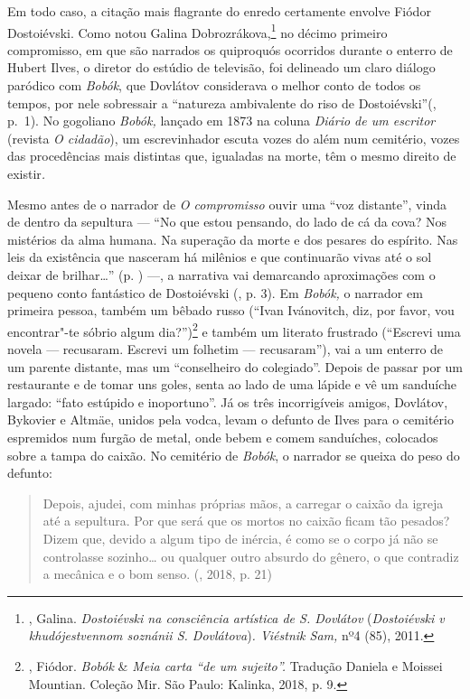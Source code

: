 Em todo caso, a citação mais flagrante do enredo certamente envolve
Fiódor Dostoiévski. Como notou Galina Dobrozrákova,\footnote{,
  Galina. \emph{Dostoiévski na consciência artística de S. Dovlátov}
  (\emph{Dostoiévski v khudójestvennom soznánii S. Dovlátova})\emph{.
  Viéstnik Sam,} nº4 (85), 2011.} no décimo primeiro
compromisso, em que são narrados os quiproquós ocorridos durante o
enterro de Hubert Ilves, o diretor do estúdio de televisão, foi
delineado um claro diálogo paródico com \emph{Bobók}, que Dovlátov
considerava o melhor conto de todos os tempos, por nele sobressair a
``natureza ambivalente do riso de Dostoiévski''(, p.~1). No
gogoliano \emph{Bobók,} lançado em 1873 na coluna \emph{Diário de um
escritor} (revista \emph{O cidadão}), um escrevinhador escuta
vozes do além num cemitério, vozes das procedências mais distintas que,
igualadas na morte, têm o mesmo direito de existir\emph{. }

Mesmo antes de o narrador de \emph{O compromisso} ouvir uma ``voz
distante'', vinda de dentro da sepultura --- ``No que estou pensando, do
lado de cá da cova? Nos mistérios da alma humana. Na superação da morte
e dos pesares do espírito. Nas leis da existência que nasceram há
milênios e que continuarão vivas até o sol deixar de brilhar\ldots{}'' (p. \pageref{ref6})
---, a narrativa vai demarcando aproximações com o pequeno conto
fantástico de Dostoiévski (, p. 3). Em \emph{Bobók,} o
narrador em primeira pessoa, também um bêbado russo (``Ivan Ivánovitch,
diz, por favor, vou encontrar"-te sóbrio algum dia?'')\footnote{,
  Fiódor. \emph{Bobók} \& \emph{Meia carta ``de um sujeito''.} Tradução
  Daniela e Moissei Mountian. Coleção Mir. São Paulo: Kalinka, 2018, p.
  9.} e também um literato frustrado (``Escrevi uma novela ---
recusaram. Escrevi um folhetim --- recusaram''), vai a um enterro de um
parente distante, mas um ``conselheiro do colegiado''. Depois de passar
por um restaurante e de tomar uns goles, senta ao lado de uma lápide e
vê um sanduíche largado: ``fato estúpido e inoportuno''. Já os três
incorrigíveis amigos, Dovlátov, Bykovier e Altmäe, unidos pela vodca,
levam o defunto de Ilves para o cemitério espremidos num furgão de
metal, onde bebem e comem sanduíches, colocados sobre a tampa do caixão.
No cemitério de \emph{Bobók}, o narrador se queixa do peso do defunto:

\begin{quotation}
Depois, ajudei, com minhas próprias mãos, a carregar o caixão da igreja
até a sepultura. Por que será que os mortos no caixão ficam tão pesados?
Dizem que, devido a algum tipo de inércia, é como se o corpo já não se
controlasse sozinho\ldots{} ou qualquer outro absurdo do gênero, o que
contradiz a mecânica e o bom senso.
{}(, 2018, p. 21)
\end{quotation}

